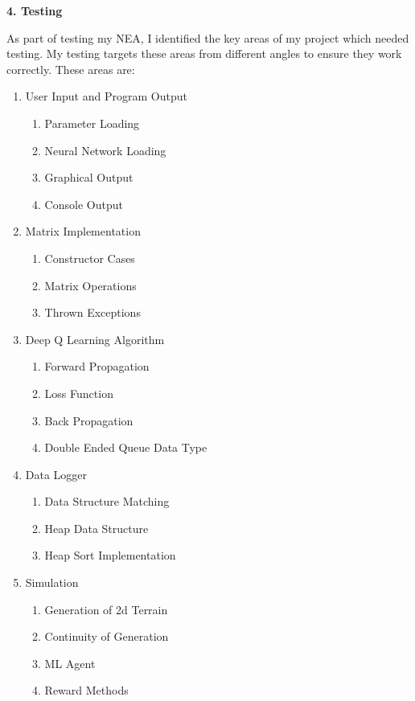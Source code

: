 \begin{flushleft}
    \huge
    \textbf{4. Testing}
    \vspace{0.1cm}
    
    \large
    As part of testing my NEA, I identified the key areas of my project which needed testing.
    My testing targets these areas from different angles to ensure they work correctly. 
    These areas are:
    \begin{enumerate}
        \item User Input and Program Output
            \begin{enumerate}
                \item Parameter Loading
                \item Neural Network Loading
                \item Graphical Output
                \item Console Output
            \end{enumerate}
        \item Matrix Implementation
            \begin{enumerate}
                \item Constructor Cases
                \item Matrix Operations
                \item Thrown Exceptions
            \end{enumerate}
        \item Deep Q Learning Algorithm
            \begin{enumerate}
                \item Forward Propagation
                \item Loss Function
                \item Back Propagation
                \item Double Ended Queue Data Type
            \end{enumerate}
        \item Data Logger
            \begin{enumerate}
                \item Data Structure Matching
                \item Heap Data Structure
                \item Heap Sort Implementation
            \end{enumerate}
        \item Simulation
            \begin{enumerate}
                \item Generation of 2d Terrain
                \item Continuity of Generation
                \item ML Agent
                \item Reward Methods
            \end{enumerate}
    \end{enumerate}
    

\end{flushleft}
